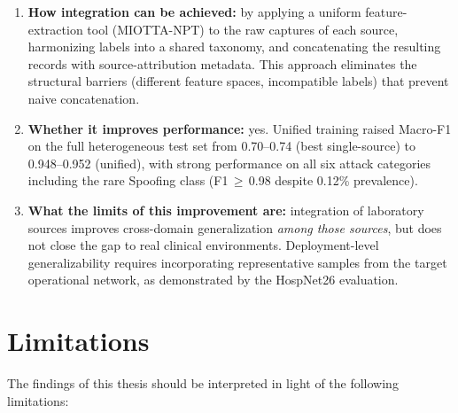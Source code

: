 \begin{enumerate}[nosep]
  \item \textbf{How integration can be achieved:} by applying a uniform feature-extraction tool (MIOTTA-NPT) to the raw captures of each source, harmonizing labels into a shared taxonomy, and concatenating the resulting records with source-attribution metadata. This approach eliminates the structural barriers (different feature spaces, incompatible labels) that prevent naive concatenation.

  \item \textbf{Whether it improves performance:} yes. Unified training raised Macro-F1 on the full heterogeneous test set from 0.70--0.74 (best single-source) to 0.948--0.952 (unified), with strong performance on all six attack categories including the rare Spoofing class (F1\,$\geq$\,0.98 despite 0.12\% prevalence).

  \item \textbf{What the limits of this improvement are:} integration of laboratory sources improves cross-domain generalization \emph{among those sources}, but does not close the gap to real clinical environments. Deployment-level generalizability requires incorporating representative samples from the target operational network, as demonstrated by the HospNet26 evaluation.
\end{enumerate}

\section{Limitations}
\label{sec:limitations}

The findings of this thesis should be interpreted in light of the following limitations:

